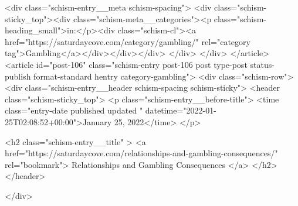 {		<div class="schism-entry__meta schism-spacing">			<div class="schism-sticky_top"><div class="schism-meta__categories"><p class="schism-heading_small">in:</p><div class="schism-cl"><a href="https://saturdaycove.com/category/gambling/" rel="category tag">Gambling</a></div></div></div>		</div>
	</div>
</article>
<article id="post-106" class="schism-entry post-106 post type-post status-publish format-standard hentry category-gambling">
	<div class="schism-row">		<div class="schism-entry__header schism-spacing schism-sticky">			<header class="schism-sticky_top">				<p class="schism-entry__before-title">
					<time class="entry-date published updated " datetime="2022-01-25T02:08:52+00:00">January 25, 2022</time>				</p>

				<h2 class="schism-entry__title" >
					<a href="https://saturdaycove.com/relationships-and-gambling-consequences/" rel="bookmark">
						Relationships and Gambling Consequences					</a>
				</h2>
			</header>

					</div>

}
